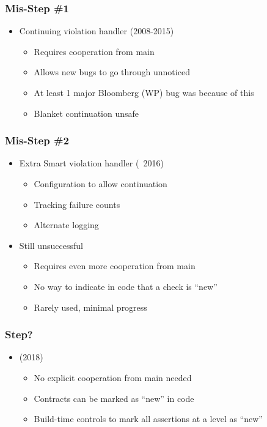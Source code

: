 \begin{frame}
  \frametitle{Mis-Step \#1}

  \begin{itemize}
  \item Continuing violation handler (2008-2015) \pause
    \begin{itemize}
    \item Requires cooperation from main \pause
    \item Allows new bugs to go through unnoticed \pause
    \item At least 1 major Bloomberg (WP) bug was because of this \pause
    \item Blanket continuation unsafe
    \end{itemize}
  \end{itemize}
\end{frame}

\begin{frame}
  \frametitle{Mis-Step \#2}
  \begin{itemize}
  \item Extra Smart violation handler (~2016) \pause
    \begin{itemize}
    \item Configuration to allow continuation \pause
    \item Tracking failure counts \pause
    \item Alternate logging \pause
    \end{itemize}
  \item Still unsuccessful \pause
    \begin{itemize}
    \item Requires even more cooperation from main \pause
    \item No way to indicate in code that a check is ``new'' \pause
    \item Rarely used, minimal progress
    \end{itemize}
  \end{itemize}
\end{frame}

\begin{frame}
  \frametitle{Step?}

  \begin{itemize}
  \item {} (2018) \pause
    \begin{itemize}
    \item No explicit cooperation from main needed \pause
    \item Contracts can be marked as ``new'' in code \pause
    \item Build-time controls to mark all assertions at a level as ``new'' \pause
    \end{itemize}
  \end{itemize}
  
\end{frame}

